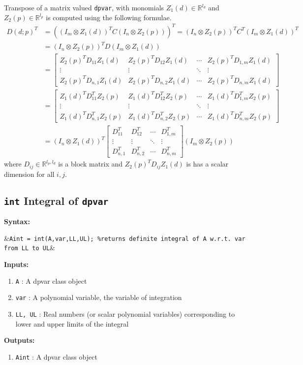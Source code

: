 \documentclass{article}
\newcommand{\bmat}[1]{\begin{bmatrix} #1\end{bmatrix}}
\newcommand{\R}{\mathbb{R}}
\newcommand{\Z}{\mathbb{Z}}
\begin{document}
	Transpose of a matrix valued \texttt{dpvar}, with monomials $Z_1(d)\in\R^{l_d}$ and $Z_2(p)\in\R^{l_p}$ is computed using the following formulae.
	\begin{align*}
		D(d;p)^T &= \left((I_m \otimes  Z_1(d))^T C (I_n \otimes Z_2(p))\right)^T = (I_n \otimes Z_2(p))^TC^T (I_m \otimes Z_1(d))^T\\
		&=  (I_n \otimes Z_2(p))^TD(I_m \otimes Z_1(d)) \\&= \bmat{Z_2(p)^TD_{11}Z_1(d)&Z_2(p)^TD_{12}Z_1(d)&\cdots&Z_2(p)^TD_{1,m}Z_1(d)\\\vdots&\vdots&\ddots&\vdots\\Z_2(p)^TD_{n,1}Z_1(d)&Z_2(p)^TD_{n,2}Z_1(d)&\cdots&Z_2(p)^TD_{n,m}Z_1(d)} \\
		&= \bmat{Z_1(d)^TD_{11}^TZ_2(p)&Z_1(d)^TD_{12}^TZ_2(p)&\cdots&Z_1(d)^TD_{1,m}^TZ_2(p)\\\vdots&\vdots&\ddots&\vdots\\Z_1(d)^TD_{n,1}^TZ_2(p)&Z_1(d)^TD_{n,2}^TZ_2(p)&\cdots&Z_1(d)^TD_{n,m}^TZ_2(p)}\\
		&= (I_n \otimes Z_1(d))^T\bmat{D_{11}^T&D_{12}^T&\cdots&D_{1,m}^T\\\vdots&\vdots&\ddots&\vdots\\D_{n,1}^T&D_{n,2}^T&\cdots&D_{n,m}^T}
		(I_m \otimes Z_2(p))
	\end{align*}
	where $D_{ij}\in \R^{l_p,l_d}$ is a block matrix and $Z_2(p)^TD_{ij}Z_1(d)$ is has a scalar dimension for all ${i,j}$.
	
	\subsection{\texttt{int} Integral of \texttt{dpvar}}

	\textbf{Syntax:}	
		\begin{flalign*}
			&\texttt{Aint = int(A,var,LL,UL); \%returns definite integral of A w.r.t. var from LL to UL}&
		\end{flalign*}
	\textbf{Inputs:}
	\begin{enumerate}
		\item \texttt{A} : A dpvar class object
		\item \texttt{var} : A polynomial variable, the variable of integration
		\item \texttt{LL, UL} : Real numbers (or scalar polynomial variables) corresponding to lower and upper limits of the integral
	\end{enumerate}
	\textbf{Outputs:}
	\begin{enumerate}
		\item \texttt{Aint} : A dpvar class object
	\end{enumerate}
\end{document}
